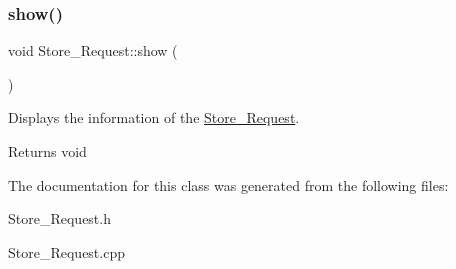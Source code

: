 \subsubsection{\texorpdfstring{show()}{show()}}
{\footnotesize\ttfamily void Store\+\_\+\+Request\+::show (\begin{DoxyParamCaption}{ }\end{DoxyParamCaption})}



Displays the information of the \hyperlink{class_store___request}{Store\+\_\+\+Request}. 

\begin{DoxyReturn}{Returns}
void 
\end{DoxyReturn}


The documentation for this class was generated from the following files\+:\begin{DoxyCompactItemize}
\item 
Store\+\_\+\+Request.\+h\item 
Store\+\_\+\+Request.\+cpp\end{DoxyCompactItemize}
